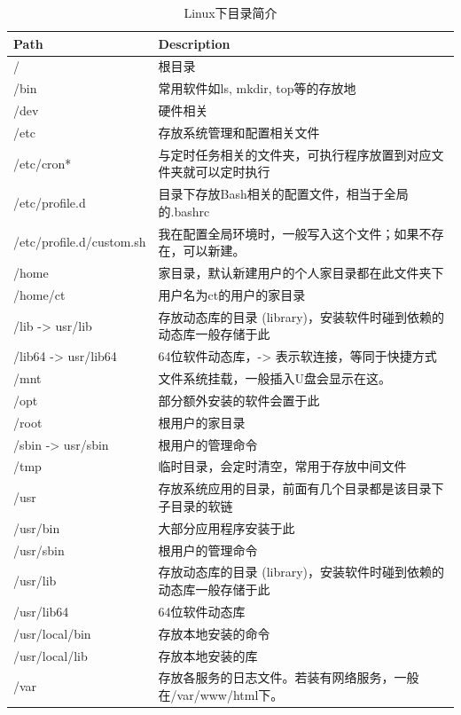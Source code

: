 \documentclass[]{article}
\numberwithin{figure}{section}
\numberwithin{table}{section}
\begin{document}
\begin{table}

\caption{\label{tab:unnamed-chunk-7}Linux下目录简介}
\centering
\begin{tabular}[t]{ll}
\toprule
Path & Description\\
\midrule
/ & 根目录\\
/bin & 常用软件如ls, mkdir, top等的存放地\\
/dev & 硬件相关\\
/etc & 存放系统管理和配置相关文件\\
/etc/cron* & 与定时任务相关的文件夹，可执行程序放置到对应文件夹就可以定时执行\\
\addlinespace
/etc/profile.d & 目录下存放Bash相关的配置文件，相当于全局的.bashrc\\
/etc/profile.d/custom.sh & 我在配置全局环境时，一般写入这个文件；如果不存在，可以新建。\\
/home & 家目录，默认新建用户的个人家目录都在此文件夹下\\
/home/ct & 用户名为ct的用户的家目录\\
/lib -> usr/lib & 存放动态库的目录 (library)，安装软件时碰到依赖的动态库一般存储于此\\
\addlinespace
/lib64 -> usr/lib64 & 64位软件动态库，-> 表示软连接，等同于快捷方式\\
/mnt & 文件系统挂载，一般插入U盘会显示在这。\\
/opt & 部分额外安装的软件会置于此\\
/root & 根用户的家目录\\
/sbin -> usr/sbin & 根用户的管理命令\\
\addlinespace
/tmp & 临时目录，会定时清空，常用于存放中间文件\\
/usr & 存放系统应用的目录，前面有几个目录都是该目录下子目录的软链\\
/usr/bin & 大部分应用程序安装于此\\
/usr/sbin & 根用户的管理命令\\
/usr/lib & 存放动态库的目录 (library)，安装软件时碰到依赖的动态库一般存储于此\\
\addlinespace
/usr/lib64 & 64位软件动态库\\
/usr/local/bin & 存放本地安装的命令\\
/usr/local/lib & 存放本地安装的库\\
/var & 存放各服务的日志文件。若装有网络服务，一般在/var/www/html下。\\
\bottomrule
\end{tabular}
\end{table}
\end{document}
